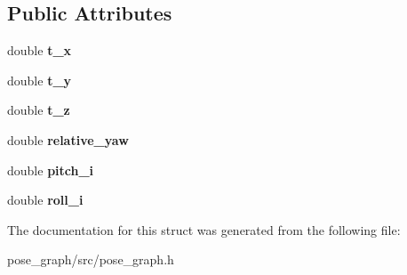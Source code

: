 \subsection*{Public Attributes}
\begin{DoxyCompactItemize}
\item 
\mbox{\label{structFourDOFError_a58b0d311f79f272f03afef5b1947f7ac}} 
double {\bfseries t\+\_\+x}
\item 
\mbox{\label{structFourDOFError_ad748899807687d5bd1a18ddcbb019352}} 
double {\bfseries t\+\_\+y}
\item 
\mbox{\label{structFourDOFError_a6394944444335ab5bc2885fbef4ad359}} 
double {\bfseries t\+\_\+z}
\item 
\mbox{\label{structFourDOFError_a0dda656e916a9b41757b151d98fa90b5}} 
double {\bfseries relative\+\_\+yaw}
\item 
\mbox{\label{structFourDOFError_a8ed812972930deae33f7d896d9d3f007}} 
double {\bfseries pitch\+\_\+i}
\item 
\mbox{\label{structFourDOFError_a932cfc99ba598476e784a6ab8e75f97b}} 
double {\bfseries roll\+\_\+i}
\end{DoxyCompactItemize}


The documentation for this struct was generated from the following file\+:\begin{DoxyCompactItemize}
\item 
pose\+\_\+graph/src/pose\+\_\+graph.\+h\end{DoxyCompactItemize}
